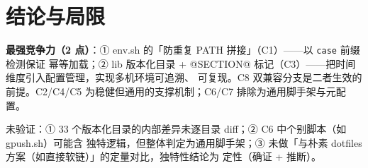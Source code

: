 \documentclass[UTF8]{ctexart}
\begin{document}
\section{结论与局限}
\begin{conclbox}
\textbf{最强竞争力（2 点）}：① env.sh 的「防重复 PATH 拼接」（C1）——以 \texttt{case} 前缀检测保证
幂等加载；② lib 版本化目录 + @SECTION@ 标记（C3）——把时间维度引入配置管理，实现多机环境可追溯、
可复现。C8 双兼容分支是二者生效的前提。C2/C4/C5 为稳健但通用的支撑机制；C6/C7 排除为通用脚手架与元配置。
\end{conclbox}
\begin{warnbox}
\textcolor{warn}{未验证}：① 33 个版本化目录的内部差异未逐目录 diff；② C6 中个别脚本（如 gpush.sh）可能含
独特逻辑，但整体判定为通用脚手架；③ 未做「与朴素 dotfiles 方案（如直接软链）」的定量对比，独特性结论为
定性（确证 + 推断）。
\end{warnbox}
\end{document}
